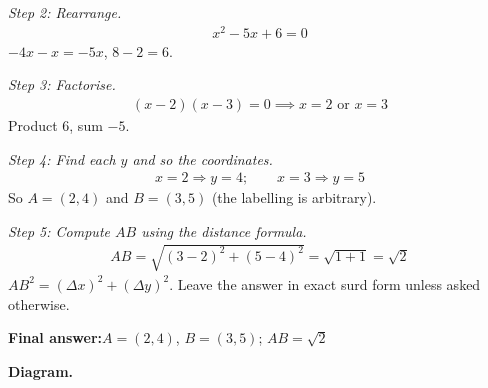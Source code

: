 \documentclass[11pt]{article}
\begin{document}
\textit{Step 2: Rearrange.}
\[\begin{gathered}
x^2 - 5x + 6 = 0
\end{gathered}\]
\( -4x - x = -5x \), \( 8 - 2 = 6 \).

\textit{Step 3: Factorise.}
\[\begin{gathered}
(x - 2)(x - 3) = 0 \implies x = 2 \text{ or } x = 3
\end{gathered}\]
Product 6, sum \( -5 \).

\textit{Step 4: Find each \( y \) and so the coordinates.}
\[\begin{gathered}
x = 2 \Rightarrow y = 4; \qquad x = 3 \Rightarrow y = 5
\end{gathered}\]
So \( A = (2, 4) \) and \( B = (3, 5) \) (the labelling is arbitrary).

\textit{Step 5: Compute \( AB \) using the distance formula.}
\[\begin{gathered}
AB = \sqrt{(3 - 2)^2 + (5 - 4)^2} = \sqrt{1 + 1} = \sqrt{2}
\end{gathered}\]
\( AB^2 = (\Delta x)^2 + (\Delta y)^2 \). Leave the answer in exact surd form unless asked otherwise.

\begin{answerbox}
\textbf{Final answer:}\quad \(\displaystyle A = (2, 4)\), \(\displaystyle B = (3, 5)\); \(\displaystyle AB = \sqrt{2}\)
\end{answerbox}
\textbf{Diagram.}
\end{document}
